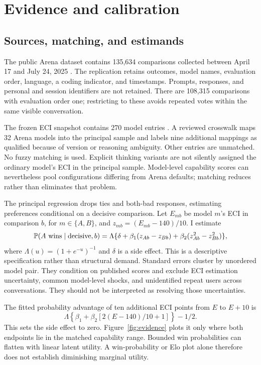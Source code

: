\section{Evidence and calibration}\label{sec:evidence}
\subsection{Sources, matching, and estimands}
The public Arena dataset contains 135,634 comparisons collected between April 17 and July 24, 2025 \citep{arena2025}. The replication retains outcomes, model names, evaluation order, language, a coding indicator, and timestamps. Prompts, responses, and personal and session identifiers are not retained. There are 108,315 comparisons with evaluation order one; restricting to these avoids repeated votes within the same visible conversation.

The frozen ECI snapshot contains 270 model entries \citep{epoch2026}. A reviewed crosswalk maps 32 Arena models into the principal sample and labels nine additional mappings as qualified because of version or reasoning ambiguity. Other entries are unmatched. No fuzzy matching is used. Explicit thinking variants are not silently assigned the ordinary model's ECI in the principal sample. Model-level capability scores can nevertheless pool configurations differing from Arena defaults; matching reduces rather than eliminates that problem.

The principal regression drops ties and both-bad responses, estimating preferences conditional on a decisive comparison. Let $E_{mb}$ be model $m$'s ECI in comparison $b$, for $m\in\{A,B\}$, and $z_{mb}=(E_{mb}-140)/10$. I estimate
\begin{equation}\label{eq:logit}
 \mathbb P(A\text{ wins}\mid\text{decisive},b)=\Lambda\{\delta+\beta_1(z_{Ab}-z_{Bb})
                                +\beta_2(z_{Ab}^2-z_{Bb}^2)\},
\end{equation}
where $\Lambda(u)=(1+e^{-u})^{-1}$ and $\delta$ is a side effect. This is a descriptive specification rather than structural demand. Standard errors cluster by unordered model pair. They condition on published scores and exclude ECI estimation uncertainty, common model-level shocks, and unidentified repeat users across conversations. They should not be interpreted as resolving those uncertainties.

The fitted probability advantage of ten additional ECI points from $E$ to $E+10$ is
\begin{equation}\label{eq:tenpoints}
 \Lambda\left\{\beta_1+\beta_2\left[2(E-140)/10+1\right]\right\}-1/2.
\end{equation}
This sets the side effect to zero. Figure~\ref{fig:evidence} plots it only where both endpoints lie in the matched capability range. Bounded win probabilities can flatten with linear latent utility. A win-probability or Elo plot alone therefore does not establish diminishing marginal utility.

